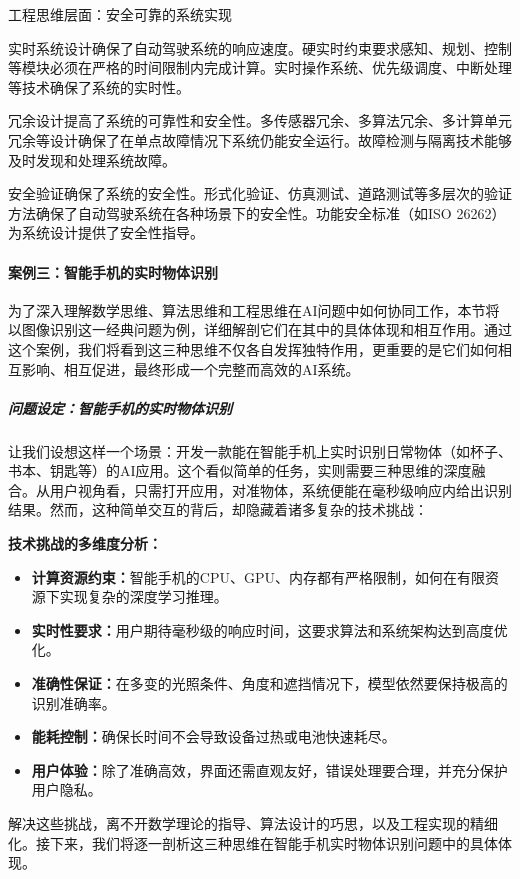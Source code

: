 工程思维层面：安全可靠的系统实现

实时系统设计确保了自动驾驶系统的响应速度。硬实时约束要求感知、规划、控制等模块必须在严格的时间限制内完成计算。实时操作系统、优先级调度、中断处理等技术确保了系统的实时性。

冗余设计提高了系统的可靠性和安全性。多传感器冗余、多算法冗余、多计算单元冗余等设计确保了在单点故障情况下系统仍能安全运行。故障检测与隔离技术能够及时发现和处理系统故障。

安全验证确保了系统的安全性。形式化验证、仿真测试、道路测试等多层次的验证方法确保了自动驾驶系统在各种场景下的安全性。功能安全标准（如ISO 26262）为系统设计提供了安全性指导。

\paragraph{案例三：智能手机的实时物体识别}
为了深入理解数学思维、算法思维和工程思维在AI问题中如何协同工作，本节将以图像识别这一经典问题为例，详细解剖它们在其中的具体体现和相互作用。通过这个案例，我们将看到这三种思维不仅各自发挥独特作用，更重要的是它们如何相互影响、相互促进，最终形成一个完整而高效的AI系统。

\subparagraph{问题设定：智能手机的实时物体识别}
让我们设想这样一个场景：开发一款能在智能手机上实时识别日常物体（如杯子、书本、钥匙等）的AI应用。这个看似简单的任务，实则需要三种思维的深度融合。从用户视角看，只需打开应用，对准物体，系统便能在毫秒级响应内给出识别结果。然而，这种简单交互的背后，却隐藏着诸多复杂的技术挑战：

\textbf{技术挑战的多维度分析：}
\begin{itemize}
\item \textbf{计算资源约束：}智能手机的CPU、GPU、内存都有严格限制，如何在有限资源下实现复杂的深度学习推理。
\item \textbf{实时性要求：}用户期待毫秒级的响应时间，这要求算法和系统架构达到高度优化。
\item \textbf{准确性保证：}在多变的光照条件、角度和遮挡情况下，模型依然要保持极高的识别准确率。
\item \textbf{能耗控制：}确保长时间不会导致设备过热或电池快速耗尽。
\item \textbf{用户体验：}除了准确高效，界面还需直观友好，错误处理要合理，并充分保护用户隐私。
\end{itemize}

解决这些挑战，离不开数学理论的指导、算法设计的巧思，以及工程实现的精细化。接下来，我们将逐一剖析这三种思维在智能手机实时物体识别问题中的具体体现。

